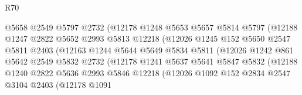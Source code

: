 \begin{lexlean}{R70}
\begin{coremodule}
                              @5658
                              @2549
                              @5797
                              @2732
                              (@12178
                                @1248
                                @5653
                                @5657
                                @5814
                                @5797
                                (@12188
                                  @1247
                                  @2822
                                  @5652
                                  @2993
                                  @5813
                                  @12218
                                  (@12026
                                    @1245
                                    @152
                                    @5650
                                    @2547
                                    @5811
                                    @2403
                                    (@12163
                                      @1244
                                      @5644
                                      @5649
                                      @5834
                                      @5811
                                      (@12026
                                        @1242
                                        @861
                                        @5642
                                        @2549
                                        @5832
                                        @2732
                                        (@12178
                                          @1241
                                          @5637
                                          @5641
                                          @5847
                                          @5832
                                          (@12188
                                            @1240
                                            @2822
                                            @5636
                                            @2993
                                            @5846
                                            @12218
                                            (@12026
                                              @1092
                                              @152
                                              @2834
                                              @2547
                                              @3104
                                              @2403
                                              (@12178
                                                @1091

\end{coremodule}
\end{lexlean}
